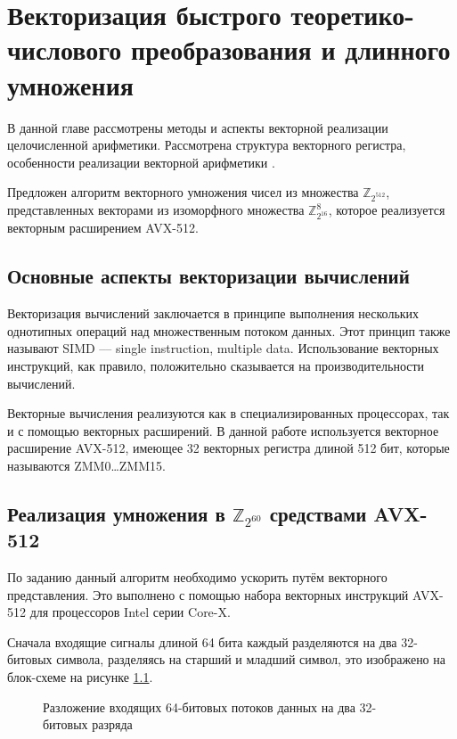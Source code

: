 \chapter{Векторизация быстрого теоретико-числового преобразования и длинного умножения}\label{chapter: implementation}
В данной главе рассмотрены методы и аспекты векторной реализации целочисленной арифметики.
Рассмотрена структура векторного регистра, особенности реализации векторной арифметики \cite{IntelManual, ArmManual}.

Предложен алгоритм векторного умножения чисел из множества $\mathbb{Z}_{2^{512}}$, представленных векторами из изоморфного множества $\mathbb{Z}_{2^{16}}^8$, которое реализуется векторным расширением AVX-512.

\section{Основные аспекты векторизации вычислений}
Векторизация вычислений заключается в принципе выполнения нескольких однотипных операций над множественным потоком данных.
Этот принцип также называют SIMD –-- single instruction, multiple data.
Использование векторных инструкций, как правило, положительно сказывается на производительности вычислений.

Векторные вычисления реализуются как в специализированных процессорах, так и с помощью векторных расширений.
В данной работе используется векторное расширение AVX-512, имеющее 32 векторных регистра длиной 512 бит, которые называются ZMM0\dots ZMM15.

\section{Реализация умножения в $\mathbb{Z}_{2^{60}}$ средствами AVX-512}
По заданию данный алгоритм необходимо ускорить путём векторного представления. Это выполнено с помощью набора векторных инструкций AVX-512 для процессоров Intel серии Core-X.

Сначала входящие сигналы длиной 64 бита каждый разделяются на два 32-битовых символа, разделяясь на старший и младший символ, это изображено на блок-схеме на рисунке \ref{eq: vector operands example}.
\begin{figure}[ht]
\centering
\caption{Разложение входящих 64-битовых потоков данных на два 32-битовых разряда}
\label{eq: vector operands example}
\end{figure}

